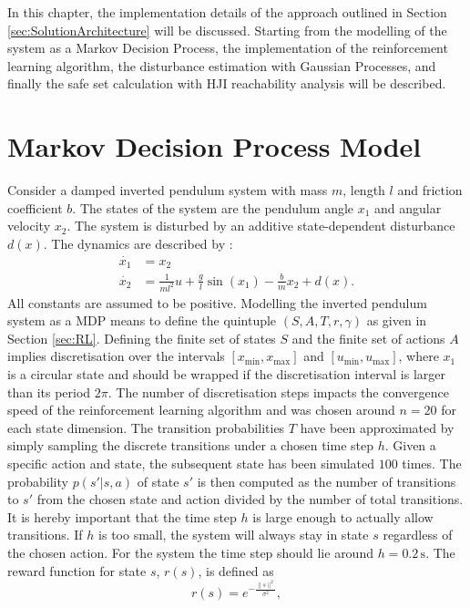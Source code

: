 \documentclass[../main.tex]{subfiles}
\begin{document}
In this chapter, the implementation details of the approach outlined in Section \ref{sec:SolutionArchitecture} will be discussed. Starting from the modelling of the system as a Markov Decision Process, the implementation of the reinforcement learning algorithm, the disturbance estimation with Gaussian Processes, and finally the safe set calculation with HJI reachability analysis will be described.
\section{Markov Decision Process Model}\label{sec:implementation_MDP}
Consider a damped inverted pendulum system with mass $m$, length $l$ and friction coefficient $b$. The states of the system are the pendulum angle $x_1$ and angular velocity $x_2$. The system is disturbed by an additive state-dependent disturbance $d(x)$. The dynamics are described by \cite{doya2000reinforcement}:
\begin{align}
    \dot{x_1} &= x_2\\
    \dot{x_2} &= \frac{1}{ml^2}u+\frac{g}{l}\sin(x_1)-\frac{b}{m}x_2+d(x).
\end{align}
All constants are assumed to be positive. 
Modelling the inverted pendulum system as a MDP means to define the quintuple $(S,A,T,r,\gamma)$ as given in Section \ref{sec:RL}. Defining the finite set of states $S$ and the finite set of actions $A$ implies discretisation over the intervals $[x_{\min}, x_{\max}]$ and $[u_{\min}, u_{\max}]$, where $x_1$ is a circular state and should be wrapped if the discretisation interval is larger than its period $2\pi$. The number of discretisation  steps impacts the convergence speed of the reinforcement learning algorithm and was chosen around $n = 20$ for each state dimension.
The transition probabilities $T$ have been approximated by simply sampling the discrete transitions under a chosen time step $h$. Given a specific action and state, the subsequent state has been simulated $100$ times. The probability $p(s'|s,a)$ of state $s'$ is then computed as the number of transitions to $s'$ from the chosen state and action divided by the number of total transitions. It is hereby important that the time step $h$ is large enough to actually allow transitions. If $h$ is too small, the system will always stay in state $s$ regardless of the chosen action. For the system the time step should lie around $h = 0.2\,\text{s}$. The reward function for state $s$, $r(s)$, is defined as
\begin{equation}
    r(s) = e^{-\frac{\|s\|^2}{\sigma^2}},
\end{equation}
\end{document}
